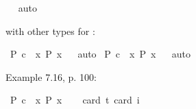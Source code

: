\begin{isabellebody}
\isadelimproof
\ %
\endisadelimproof
%
\isatagproof
{}\isamarkupfalse%
\ auto%
\endisatagproof
{\isafoldproof}%
%
\isadelimproof
%
\endisadelimproof
%
\begin{isamarkuptext}%
with other types for :%
\end{isamarkuptext}\isamarkuptrue%
\isamarkupfalse%
\ {\isachardoublequoteopen}{\isasymlfloor}\isactrlbold {\isasymbox}{\isacharparenleft}P\ {\isacharparenleft}c{\isacharcolon}{\isacharcolon}{\isasymzero}{\isacharparenright}{\isacharparenright}\ \isactrlbold {\isasymrightarrow}\ {\isacharparenleft}\isactrlbold {\isasymexists}x{\isacharcolon}{\isacharcolon}{\isasymzero}{\isachardot}\ \isactrlbold {\isasymbox}{\isacharparenleft}P\ x{\isacharparenright}{\isacharparenright}{\isasymrfloor}{\isachardoublequoteclose}%
\isadelimproof
\ %
\endisadelimproof
%
\isatagproof
{}\isamarkupfalse%
\ auto%
\endisatagproof
{\isafoldproof}%
%
\isadelimproof
%
\endisadelimproof
\isanewline
{}\isamarkupfalse%
\ {\isachardoublequoteopen}{\isasymlfloor}\isactrlbold {\isasymbox}{\isacharparenleft}P\ {\isacharparenleft}c{\isacharcolon}{\isacharcolon}{\isasymlangle}{\isasymzero}{\isasymrangle}{\isacharparenright}{\isacharparenright}\ \isactrlbold {\isasymrightarrow}\ {\isacharparenleft}\isactrlbold {\isasymexists}x{\isacharcolon}{\isacharcolon}{\isasymlangle}{\isasymzero}{\isasymrangle}{\isachardot}\ \isactrlbold {\isasymbox}{\isacharparenleft}P\ x{\isacharparenright}{\isacharparenright}{\isasymrfloor}{\isachardoublequoteclose}%
\isadelimproof
\ %
\endisadelimproof
%
\isatagproof
{}\isamarkupfalse%
\ auto%
\endisatagproof
{\isafoldproof}%
%
\isadelimproof
%
\endisadelimproof
%
\begin{isamarkuptext}%
Example 7.16, p. 100:%
\end{isamarkuptext}\isamarkuptrue%
\isamarkupfalse%
\ {\isachardoublequoteopen}{\isasymlfloor}\isactrlbold {\isasymbox}{\isacharparenleft}P\ \isactrlbold {\isasymdownharpoonleft}{\isacharparenleft}c{\isacharcolon}{\isacharcolon}{\isasymup}{\isasymzero}{\isacharparenright}{\isacharparenright}\ \isactrlbold {\isasymrightarrow}\ {\isacharparenleft}\isactrlbold {\isasymexists}x{\isacharcolon}{\isacharcolon}{\isasymzero}{\isachardot}\ \isactrlbold {\isasymbox}{\isacharparenleft}P\ x{\isacharparenright}{\isacharparenright}{\isasymrfloor}{\isachardoublequoteclose}\ \isanewline
\ \ \isamarkupfalse%
{\isacharbrackleft}card\ {\isacharprime}t{\isacharequal}{}{\isacharcomma}\ card\ i{\isacharequal}{}{\isacharbrackright}%

\end{isabellebody}

